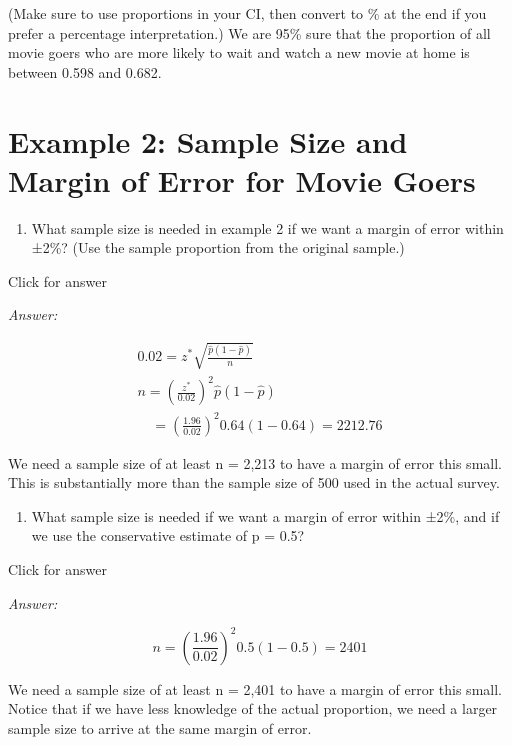 \documentclass[
]{book}
\providecommand{\tightlist}{%
  \setlength{\itemsep}{0pt}\setlength{\parskip}{0pt}}
\begin{document}
(Make sure to use proportions in your CI, then convert to \% at the end if you prefer a percentage interpretation.) We are 95\% sure that the proportion of all movie goers who are more likely to wait and watch a new movie at home is between 0.598 and 0.682.

\hypertarget{example-2-sample-size-and-margin-of-error-for-movie-goers}{%
\section{Example 2: Sample Size and Margin of Error for Movie Goers}\label{example-2-sample-size-and-margin-of-error-for-movie-goers}}

\begin{enumerate}
\def\labelenumi{(\alph{enumi})}
\tightlist
\item
  What sample size is needed in example 2 if we want a margin of error within ±2\%? (Use the sample proportion from the original sample.)
\end{enumerate}

Click for answer

\emph{Answer:}

\[\begin{array}{l}
0.02=z^{*} \sqrt{\frac{\hat{p}(1-\hat{p})}{n}} \\
n=\left(\frac{z^{*}}{0.02}\right)^{2} \hat{p}(1-\hat{p})\\\quad =\left(\frac{1.96}{0.02}\right)^{2} 0.64(1-0.64)=2212.76
\end{array}\]

We need a sample size of at least n = 2,213 to have a margin of error this small. This is substantially more than the sample size of 500 used in the actual survey.

\begin{enumerate}
\def\labelenumi{(\alph{enumi})}
\setcounter{enumi}{1}
\tightlist
\item
  What sample size is needed if we want a margin of error within ±2\%, and if we use the conservative estimate of p = 0.5?
\end{enumerate}

Click for answer

\emph{Answer:}

\[n=\left(\frac{1.96}{0.02}\right)^{2} 0.5(1-0.5)=2401\]

We need a sample size of at least n = 2,401 to have a margin of error this small. Notice that if we have less knowledge of the actual proportion, we need a larger sample size to arrive at the same margin of error.
\end{document}
